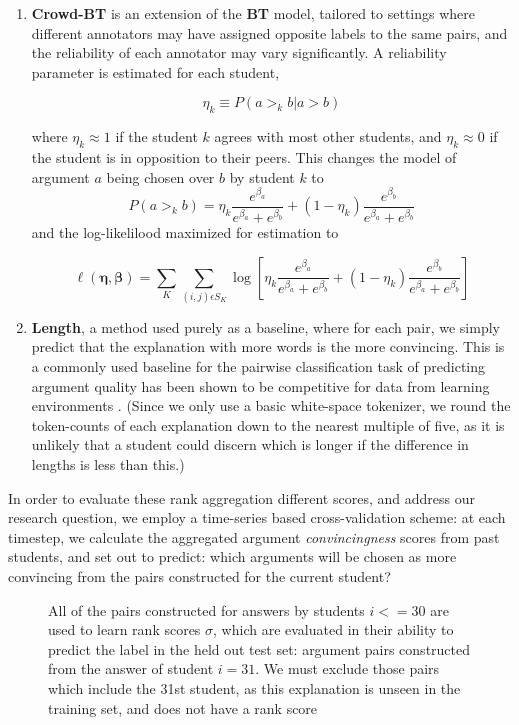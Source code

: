 \documentclass[notitlepage,12pt]{jedm}
\begin{document}
\begin{enumerate}
	\item \textbf{Crowd-BT} \cite{chen_pairwise_2013} is an extension of the 
	\textbf{BT} model, tailored to settings where different annotators may have 
	assigned opposite labels to the same pairs, and the reliability of each 
	annotator may vary significantly. 
	A reliability parameter is estimated for each student, 
	
	$$
	\eta_k \equiv P(a >_k b | a >b )
	$$
	
	where $\eta_k \approx 1$ if the student  $k$ agrees with most other 
	students, and $\eta_k \approx 0$ if the student is in opposition to their 
	peers.
	This changes the model of argument $a$ being chosen over $b$ by student $k$ 
	to 
	$$
	P(a >_k b) = 
	\eta_k \frac{e^{\beta_a}}{e^{\beta_a}+e^{\beta_b}} + (1-\eta_k) 
	\frac{e^{\beta_b}}{e^{\beta_a}+e^{\beta_b}}
	$$
	and the log-likelilood maximized for estimation to 
	
	$$
	\ell(\boldsymbol{\eta},\boldsymbol{\beta})=\sum_{K}\sum_{(i,j)\epsilon 
		S_K}^{} 
	\log \left[ \eta_k \frac{e^{\beta_a}}{e^{\beta_a}+e^{\beta_b}} + (1-\eta_k) 
	\frac{e^{\beta_b}}{e^{\beta_a}+e^{\beta_b}} \right]
	$$
	
	\item \textbf{Length}, a method used purely as a baseline, where for each 
	pair, we simply predict that the explanation with more words is the more 
	convincing.
	This is a commonly used baseline  for the pairwise classification task of 
	predicting argument quality \cite{toledo_automatic_2019} has been shown to 
	be competitive for data from learning environments 
	\cite{bhatnagar_learnersourcing_2020}.
	(Since we only use a basic white-space tokenizer, we round the token-counts 
	of each explanation down to the nearest multiple of five, as it is unlikely 
	that a student could discern which is longer if the difference in lengths 
	is less than this.)
\end{enumerate}

In order to evaluate these rank aggregation different scores, and address 
our research question, we employ a time-series based cross-validation scheme:
at each timestep, we calculate the aggregated argument \textit{convincingness} 
scores from past students, and set out to predict: which arguments will be 
chosen as more convincing from the pairs constructed for the current student?  



\begin{figure}
	\centering
	\def\svgscale{0.5}
	
	\caption{
		All of the pairs constructed for answers by students $i<=30$ are used 
		to learn rank scores $\sigma$, which are evaluated in their ability to 
		predict the label in the held out test set: argument pairs constructed 
		from the answer of student $i=31$.
		We must exclude those pairs which include the 31st student, as this 
		explanation is unseen in the training set, and does not have a rank 
		score 
	}
	\label{fig:make_pairs_time_series}
\end{figure}
\end{document}
